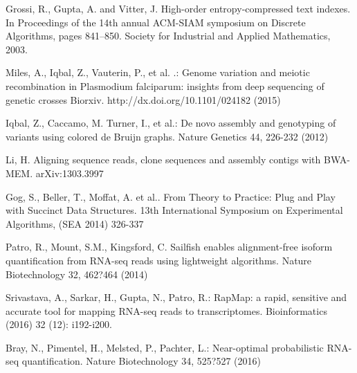 \documentclass[runningheads,a4paper]{llncs}
\begin{document}
\begin{thebibliography}{4}
 Grossi, R., Gupta, A. and Vitter, J. High-order entropy-compressed text indexes. In Proceedings of the 14th annual ACM-SIAM symposium on Discrete Algorithms, pages 841–850. Society for Industrial and Applied Mathematics, 2003.

 Miles, A., Iqbal, Z., Vauterin, P., et al. .: Genome variation and meiotic recombination in Plasmodium falciparum: insights from deep sequencing of genetic crosses Biorxiv. http://dx.doi.org/10.1101/024182 (2015)

 Iqbal, Z., Caccamo, M. Turner, I.,  et al.: De novo assembly and genotyping of variants using colored de Bruijn graphs. Nature Genetics  44, 226-232 (2012)

 Li, H. Aligning sequence reads, clone sequences and assembly contigs with BWA-MEM. 	arXiv:1303.3997

 Gog, S., Beller, T., Moffat, A. et al.. From Theory to Practice: Plug and Play with Succinct Data Structures. 13th International Symposium on Experimental Algorithms, (SEA 2014) 326-337

 Patro, R., Mount, S.M., Kingsford, C. Sailfish enables alignment-free isoform quantification from RNA-seq reads using lightweight algorithms. Nature Biotechnology 32, 462?464 (2014)

 Srivastava, A., Sarkar, H., Gupta, N., Patro, R.: RapMap: a rapid, sensitive and accurate tool for mapping RNA-seq reads to transcriptomes. Bioinformatics (2016) 32 (12): i192-i200.

 Bray, N., Pimentel, H., Melsted, P., Pachter, L.: Near-optimal probabilistic RNA-seq quantification. Nature Biotechnology 34, 525?527 (2016) 
\end{thebibliography}
\end{document}
